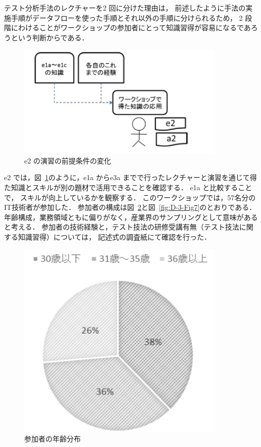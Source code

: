 テスト分析手法のレクチャーを2 回に分けた理由は， 前述したように手法の実施手順がデータフローを使った手順とそれ以外の手順に分けられるため， 2 段階にわけることがワークショップの参加者にとって知識習得が容易になるであろうという判断からである．

\begin{figure}[h]
\begin{center}
\includegraphics[width=10cm]{./image/D-3-Fig9.png}
\caption{e2 の演習の前提条件の変化}
\label{fig:D-3-Fig9}
\end{center}
\end{figure}
e2 では，図~\ref{fig:D-3-Fig9}のように，e1a からe3a までで行ったレクチャーと演習を通じて得た知識とスキルが別の題材で活用できることを確認する． e1a と比較することで， スキルが向上しているかを観察する．
このワークショップでは，57名分のIT技術者が参加した．
参加者の構成は図~\ref{fig:D-3-Fig6}と図~\ref{fig:D-3-Fig7}のとおりである．
年齢構成，業務領域ともに偏りがなく，産業界のサンプリングとして意味があると考える．
参加者の技術経験と，テスト技法の研修受講有無（テスト技法に関する知識習得）については， 記述式の調査紙にて確認を行った．

\begin{figure}[h]
  \begin{center}
  \includegraphics[width=10cm]{./image/D-3-Fig6.png}
  \caption{参加者の年齢分布}
  \label{fig:D-3-Fig6}
  \end{center}
   \end{figure}

